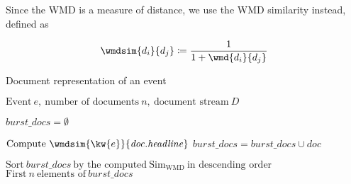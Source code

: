 \begin{enumerate}
Since the WMD is a measure of distance, we use the WMD similarity instead, defined as

\begin{equation}
	\wmdsim{d_{i}}{d_{j}} \coloneqq \frac{1}{1 + \wmd{d_{i}}{d_{j}}}
\end{equation}

\begin{algorithm}[H]
\begin{algorithmic}[1]
\caption{Document representation of an event}
\Input $\text{Event}\ e,\ \text{number of documents}\ n,\ \text{document stream}\ D$

\State $\mathit{burst\_docs} = \emptyset$

		\State $\text{Compute}\ \wmdsim{\kw{e}}{\mathit{doc.headline}}$
		\State $\mathit{burst\_docs} = \mathit{burst\_docs} \cup \mathit{doc}$
	\EndIf
\EndFor

\State $\text{Sort}\ \mathit{burst\_docs}\ \text{by the computed}\ \text{Sim}_{\text{WMD}} \ \text{in descending order}$
\Output $\text{First}\ n\ \text{elements of}\ \mathit{burst\_docs}$
\end{algorithmic}
\end{algorithm}

\end{enumerate}